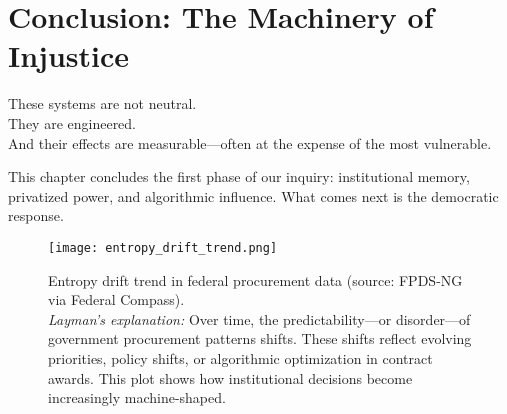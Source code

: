 \documentclass[12pt]{article}
\begin{document}
\section*{Conclusion: The Machinery of Injustice}
These systems are not neutral.\\
They are engineered.\\
And their effects are measurable—often at the expense of the most vulnerable.

This chapter concludes the first phase of our inquiry: institutional memory, privatized power, and algorithmic influence. What comes next is the democratic response.

\begin{figure}[ht]
  \centering
  \texttt{[image: entropy\_drift\_trend.png]}
  \caption{Entropy drift trend in federal procurement data (source: FPDS-NG via Federal Compass).\\
  \textit{Layman's explanation:} Over time, the predictability—or disorder—of government procurement patterns shifts. These shifts reflect evolving priorities, policy shifts, or algorithmic optimization in contract awards. This plot shows how institutional decisions become increasingly machine-shaped.}
\end{figure}
\end{document}
